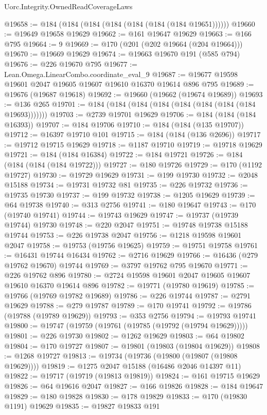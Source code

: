 \begin{lexlean}{Uorc.Integrity.OwnedReadCoverageLaws}
\begin{coremodule}
@19658 := @184 (@184 (@184 (@184 (@184 (@184 (@184 @19651))))))
@19660 := @19649 @19658 @19629
@19662 := @161 @19647 @19629
@19663 := @166 @795
@19664 := 9
@19669 := @170 (@201 (@202 @19664 (@204 @19664)))
@19670 := @19669 @19629
@19674 := @19663 @19670 @191 (@585 @794)
@19676 := @226 @19670 @795
@19677 := Lean.Omega.LinearCombo.coordinate_eval_9
@19687 := @19677 @19598 @19601 @2047 @19605 @19607 @19610 @16370 @19614 @896 @795
@19689 := @19676 (@19687 @19618)
@19692 := @19660 (@19662 (@19674 @19689))
@19693 := @136 @265
@19701 := @184 (@184 (@184 (@184 (@184 (@184 (@184 (@184 @19693)))))))
@19703 := @2739 @19701 @19629
@19706 := @184 (@184 (@184 @16393))
@19707 := @184 @19706
@19710 := @184 (@184 (@135 @19707))
@19712 := @16397 @19710 @101
@19715 := @184 (@184 (@136 @2696))
@19717 := @19712 @19715 @19629
@19718 := @1187 @19710
@19719 := @19718 @19629
@19721 := @184 (@184 @16384)
@19722 := @184 @19721
@19726 := @184 (@184 (@184 (@184 @19722)))
@19727 := @180 @19726
@19729 := @170 (@1192 @19727)
@19730 := @19729 @19629
@19731 := @199 @19730
@19732 := @2048 @15188
@19734 := @19731 @19732 @81
@19735 := @226 @19732
@19736 := @19735 @19730
@19737 := @199 @19732
@19738 := @1205 @19629
@19739 := @64 @19738
@19740 := @313 @2756
@19741 := @180 @19647
@19743 := @170 (@19740 @19741)
@19744 := @19743 @19629
@19747 := @19737 (@19739 @19744) @19730
@19748 := @220 @2047
@19751 := @19748 @19738 @15188 @19744
@19753 := @226 @19738 @2047
@19756 := @1218 @19598 @19601 @2047
@19758 := @19753 (@19756 @19625)
@19759 := @19751 @19758
@19761 := @16431 @19744 @16434
@19762 := @2716 @19629
@19766 := @16436 (@279 @19762 @19670) @19744
@19769 := @3797 @19762 @795 @19670
@19771 := @226 @19762 @896
@19780 := @2724 @19598 @19601 @2047 @19605 @19607 @19610 @16370 @19614 @896
@19782 := @19771 (@19780 @19619)
@19785 := @19766 (@19769 @19782 @19689)
@19786 := @226 @19744
@19787 := @2791 @19629
@19788 := @279 @19787
@19789 := @170 @19741
@19792 := @19786 (@19788 (@19789 @19629))
@19793 := @353 @2756
@19794 := @19793 @19741
@19800 := @19747 (@19759 (@19761 (@19785 (@19792 (@19794 @19629)))))
@19801 := @226 @19730
@19802 := @1262 @19629
@19803 := @64 @19802
@19804 := @170 @19727
@19807 := @19801 (@19803 (@19804 @19629))
@19808 := @1268 @19727
@19813 := @19734 (@19736 (@19800 (@19807 (@19808 @19629))))
@19819 := @1275 @2047 @15188 (@16486 @2046 @14397 @11)
@19822 := @19717 (@19719 (@19813 @19819))
@19824 := @161 @19715 @19629
@19826 := @64 @19616 @2047
@19827 := @166 @19826
@19828 := @184 @19647
@19829 := @180 @19828
@19830 := @178 @19829
@19833 := @170 (@19830 @1191) @19629
@19835 := @19827 @19833 @191

\end{coremodule}
\end{lexlean}
